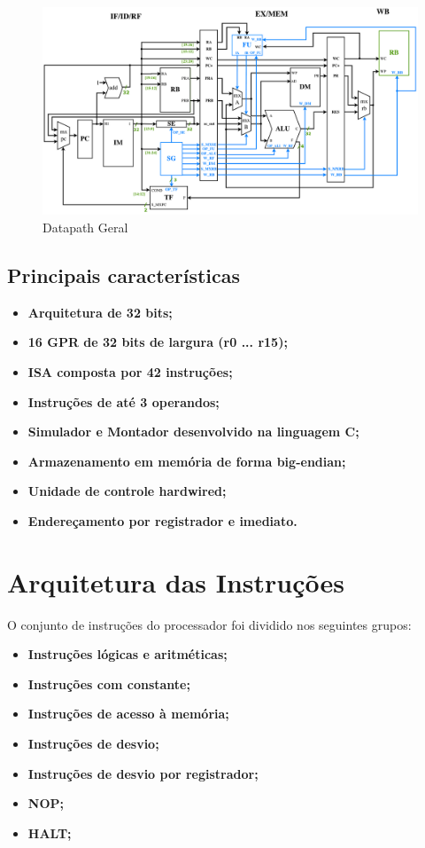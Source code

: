 \documentclass{report}
\begin{document}
\begin{figure}[H]
\centering
\includegraphics[width=\textwidth]{./pictures/Datapath.pdf}
\caption{Datapath Geral}
\end{figure}

\subsection{Principais características}
\begin{itemize}
    \item \textbf {Arquitetura de 32 bits;}
    \item \textbf {16 GPR de 32 bits de largura (r0 ... r15);}
    \item \textbf {ISA composta por 42 instruções;}
    \item \textbf {Instruções de até 3 operandos;}
    \item \textbf {Simulador e Montador desenvolvido na linguagem C;}
    \item \textbf {Armazenamento em memória de forma big-endian;}
    \item \textbf {Unidade de controle hardwired;}
    \item \textbf {Endereçamento por registrador e imediato.}
\end{itemize}

\newpage
\section{Arquitetura das Instruções}
O conjunto de instruções do processador foi dividido nos seguintes grupos:\newline
\begin{itemize}
    \item \textbf {Instruções lógicas e aritméticas;}
    \item \textbf {Instruções com constante;}
    \item \textbf {Instruções de acesso à memória;}
    \item \textbf {Instruções de desvio;}
    \item \textbf {Instruções de desvio por registrador;}
    \item \textbf {NOP;}
    \item \textbf {HALT;}
\end{itemize}
\end{document}
